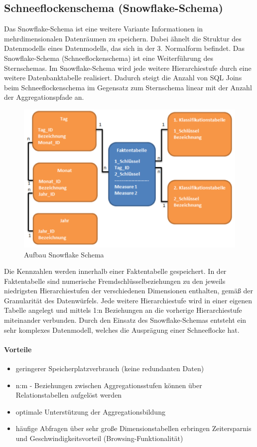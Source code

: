 \subsection{Schneeflockenschema (Snowflake-Schema)}

Das Snowflake-Schema ist eine weitere Variante Informationen in mehrdimensionalen Datenräumen zu speichern. Dabei ähnelt die Struktur des Datenmodells eines Datenmodells, das sich in der 3. Normalform befindet.
Das Snowflake-Schema (Schneeflockenschema) ist eine Weiterführung des Sternschemas. Im Snowflake-Schema wird jede weitere Hierarchiestufe durch eine weitere Datenbanktabelle realisiert.
Dadurch steigt die Anzahl von SQL Joins beim Schneeflockenschema im Gegensatz zum Sternschema linear mit der Anzahl der Aggregationspfade an.

\begin{figure}[H]
    \centering
    \includegraphics[width=.8\textwidth]{Content/images/modellierung/snow.png}
    \caption{Aufbau Snowflake Schema}
    \label{fig:modellierung:snow}
\end{figure}

Die Kennzahlen werden innerhalb einer Faktentabelle gespeichert. In der Faktentabelle sind numerische Fremdschlüsselbeziehungen zu den jeweils niedrigsten Hierarchiestufen der verschiedenen Dimensionen enthalten, gemäß der Granularität des Datenwürfels.
Jede weitere Hierarchiestufe wird in einer eigenen Tabelle angelegt und mittels 1:n Beziehungen an die vorherige Hierarchiestufe miteinander verbunden. Durch den Einsatz des Snowflake-Schemas entsteht ein sehr komplexes Datenmodell, welches die Ausprägung einer Schneeflocke hat.

\paragraph{Vorteile}
\begin{itemize}
    \item geringerer Speicherplatzverbrauch (keine redundanten Daten)
    \item n:m - Beziehungen zwischen Aggregationsstufen können über Relationstabellen aufgelöst werden
    \item optimale Unterstützung der Aggregationsbildung
    \item häufige Abfragen über sehr große Dimensionstabellen erbringen Zeitersparnis und Geschwindigkeitsvorteil (Browsing-Funktionalität)

\end{itemize}


